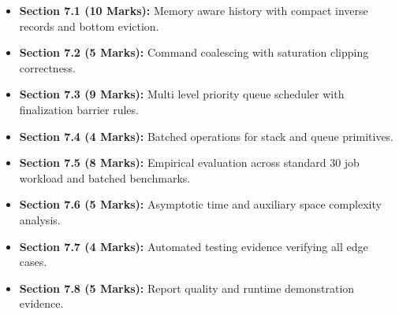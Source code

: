 \documentclass[10pt,a4paper]{article}
\begin{document}
\begin{itemize}
    \item \textbf{Section 7.1 (10 Marks):} Memory aware history with compact inverse records and bottom eviction.
    \item \textbf{Section 7.2 (5 Marks):} Command coalescing with saturation clipping correctness.
    \item \textbf{Section 7.3 (9 Marks):} Multi level priority queue scheduler with finalization barrier rules.
    \item \textbf{Section 7.4 (4 Marks):} Batched operations for stack and queue primitives.
    \item \textbf{Section 7.5 (8 Marks):} Empirical evaluation across standard 30 job workload and batched benchmarks.
    \item \textbf{Section 7.6 (5 Marks):} Asymptotic time and auxiliary space complexity analysis.
    \item \textbf{Section 7.7 (4 Marks):} Automated testing evidence verifying all edge cases.
    \item \textbf{Section 7.8 (5 Marks):} Report quality and runtime demonstration evidence.
\end{itemize}

\clearpage
\end{document}
